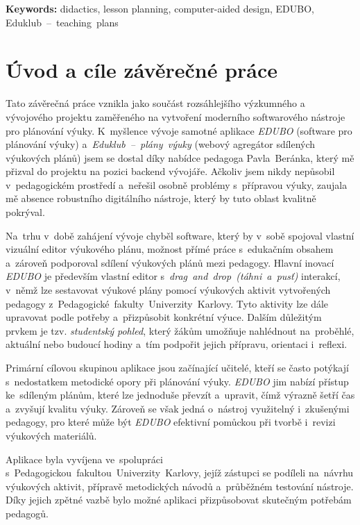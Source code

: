 \documentclass[male,czech,api_bc]{kitheses}
\begin{document}
\textbf{Keywords:} didactics, lesson planning, computer-aided design, EDUBO, Eduklub~--~teaching~plans

\tableofcontents

\chapter{Úvod a cíle závěrečné práce}

Tato závěrečná práce vznikla jako součást rozsáhlejšího výzkumného a vývojového projektu zaměřeného na vytvoření moderního softwarového nástroje pro plánování výuky. K~myšlence vývoje samotné aplikace \textit{EDUBO} (software pro plánování výuky) a~\textit{Eduklub~--~plány~výuky} (webový agregátor sdílených výukových plánů) jsem se dostal díky nabídce pedagoga Pavla~Beránka, který mě přizval do projektu na pozici backend vývojáře. Ačkoliv jsem nikdy nepůsobil v~pedagogickém prostředí a~neřešil osobně problémy s~přípravou výuky, zaujala mě absence robustního digitálního nástroje, který by tuto oblast kvalitně pokrýval.

Na~trhu v~době zahájení vývoje chyběl software, který by v~sobě spojoval vlastní vizuální editor výukového plánu, možnost přímé práce s~edukačním obsahem a~zároveň podporoval sdílení výukových plánů mezi pedagogy. Hlavní inovací \textit{EDUBO} je především vlastní editor s~\textit{drag~and~drop~(táhni~a~pusť)} interakcí, v~němž lze sestavovat výukové plány pomocí výukových aktivit vytvořených pedagogy z~Pedagogické~fakulty~Univerzity~Karlovy. Tyto aktivity lze dále upravovat podle potřeby a~přizpůsobit konkrétní výuce. Dalším důležitým prvkem je tzv. \textit{studentský pohled}, který žákům umožňuje nahlédnout na~proběhlé, aktuální nebo budoucí hodiny a~tím podpořit jejich přípravu, orientaci i~reflexi.

Primární cílovou skupinou aplikace jsou začínající učitelé, kteří se často potýkají s~nedostatkem metodické opory při plánování výuky. \textit{EDUBO} jim nabízí přístup ke~sdíleným plánům, které lze jednoduše převzít a~upravit, čímž výrazně šetří čas a~zvyšují kvalitu výuky. Zároveň se však jedná o~nástroj využitelný i~zkušenými pedagogy, pro které může být \textit{EDUBO} efektivní pomůckou při tvorbě i~revizi výukových materiálů.

Aplikace byla vyvíjena ve~spolupráci s~Pedagogickou~fakultou~Univerzity~Karlovy, jejíž zástupci se podíleli na~návrhu výukových aktivit, přípravě metodických návodů a~průběžném testování nástroje. Díky jejich zpětné vazbě bylo možné aplikaci přizpůsobovat skutečným potřebám pedagogů.
\end{document}
